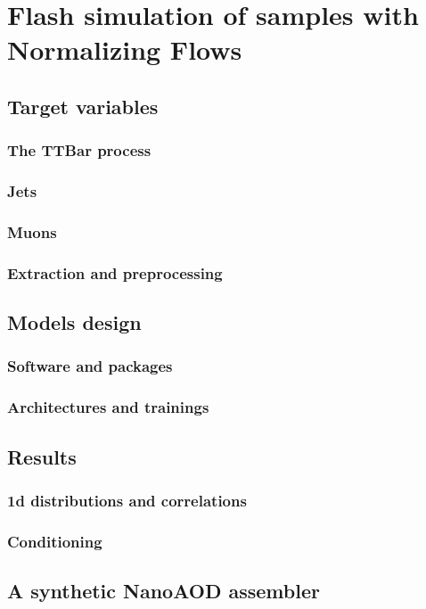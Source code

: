 \chapter{Flash simulation of samples with Normalizing Flows}\label{ch:fs} %

\section{Target variables}

\subsection{The TTBar process}

\subsection{Jets}

\subsection{Muons}

\subsection{Extraction and preprocessing}

\section{Models design}

\subsection{Software and packages}

\subsection{Architectures and trainings}

\section{Results}

\subsection{1d distributions and correlations}

\subsection{Conditioning}

\section{A synthetic NanoAOD assembler}
